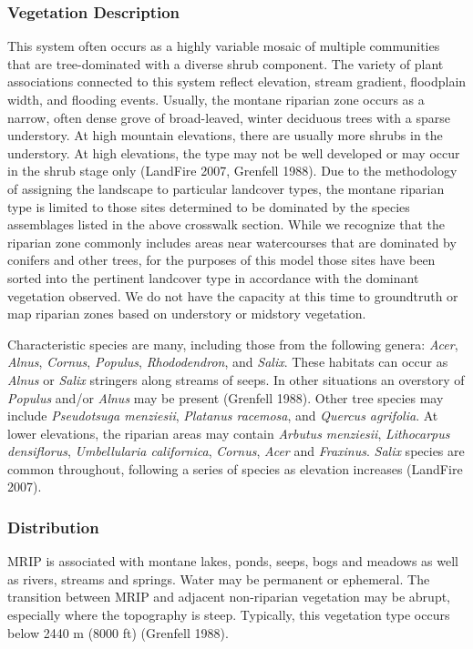 \subsubsection{Vegetation Description}
This system often occurs as a highly variable mosaic of multiple communities that are tree-dominated with a diverse shrub component. The variety of plant associations connected to this system reflect elevation, stream gradient, floodplain width, and flooding events. Usually, the montane riparian zone occurs as a narrow, often dense grove of broad-leaved, winter deciduous trees with a sparse understory. At high mountain elevations, there are usually more shrubs in the understory. At high elevations, the type may not be well developed or may occur in the shrub stage only (LandFire 2007, Grenfell 1988). Due to the methodology of assigning the landscape to particular landcover types, the montane riparian type is limited to those sites determined to be dominated by the species assemblages listed in the above crosswalk section. While we recognize that the riparian zone commonly includes areas near watercourses that are dominated by conifers and other trees, for the purposes of this model those sites have been sorted into the pertinent landcover type in accordance with the dominant vegetation observed. We do not have the capacity at this time to groundtruth or map riparian zones based on understory or midstory vegetation.

Characteristic species are many, including those from the following genera: \emph{Acer}, \emph{Alnus}, \emph{Cornus}, \emph{Populus}, \emph{Rhododendron}, and \emph{Salix}. These habitats can occur as \emph{Alnus} or \emph{Salix} stringers along streams of seeps. In other situations an overstory of \emph{Populus} and/or \emph{Alnus} may be present (Grenfell 1988). Other tree species may include \emph{Pseudotsuga menziesii}, \emph{Platanus racemosa}, and \emph{Quercus agrifolia}. At lower elevations, the riparian areas may contain \emph{Arbutus menziesii}, \emph{Lithocarpus densiflorus}, \emph{Umbellularia californica}, \emph{Cornus}, \emph{Acer} and \emph{Fraxinus}. \emph{Salix} species are common throughout, following a series of species as elevation increases (LandFire 2007).


\subsubsection{Distribution}
MRIP is associated with montane lakes, ponds, seeps, bogs and meadows as well as rivers, streams and springs. Water may be permanent or ephemeral. The transition between MRIP and adjacent non-riparian vegetation may be abrupt, especially where the topography is steep. Typically, this vegetation type occurs below 2440 m (8000 ft) (Grenfell 1988).

